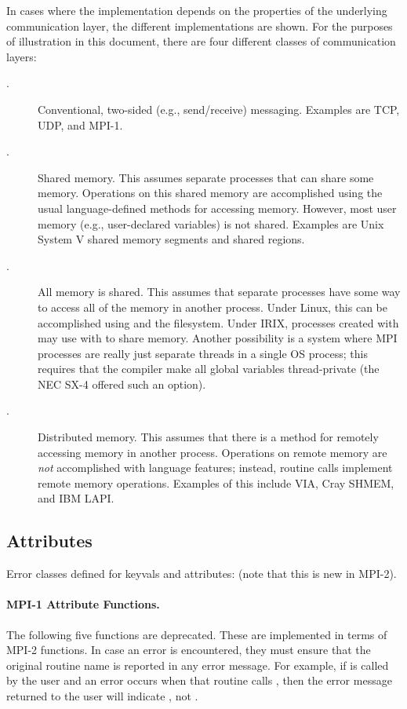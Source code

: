 \documentclass{article}
\begin{document}
In cases where the implementation depends on the properties of the
underlying communication layer, the different implementations are
shown.  For the purposes of illustration in this document, there are
four different classes of communication layers:
\begin{description}
\item[\tcpname.]Conventional, two-sided (e.g., send/receive)
messaging.  Examples are TCP, UDP, and MPI-1.  

\item[\shmemname.]Shared memory.  This assumes separate processes that
can share some memory.  Operations on this shared memory are
accomplished using the usual language-defined methods for accessing
memory.  However, most user memory (e.g., user-declared
variables) is not shared.  Examples are Unix System V shared memory
segments and shared  regions.  

\item[\shmemallname.]All memory is shared.  This assumes that separate
  processes have some way to access all of the memory in another process.
  Under Linux, this can be accomplished using  and the
   filesystem.  Under IRIX, processes created with
   may use  with  to share
  memory. Another possibility is a system where MPI 
  processes are really just separate threads in a single OS process; this
  requires that the compiler make all global variables thread-private (the NEC
  SX-4 offered such an option).

\item[\vianame.]Distributed memory.  This assumes that there is a
method for remotely accessing memory in another process.  Operations
on remote memory are \emph{not} accomplished with language features;
instead, routine calls implement remote memory operations.  Examples
of this include VIA, Cray SHMEM, and IBM LAPI.
\end{description}

\subsection{Attributes}
\label{sec:attr}

Error classes defined for keyvals and attributes:
 (note that this is new in MPI-2).


\paragraph{MPI-1 Attribute Functions.}
The following five functions are deprecated.  These are implemented in
terms of MPI-2 functions.  In case an error is encountered, they must 
ensure that the original routine name is reported in any error
message.  For example, if  is called by the
user and an error occurs when that routine calls
, then the error message returned to the
user will indicate , not
.
\end{document}
